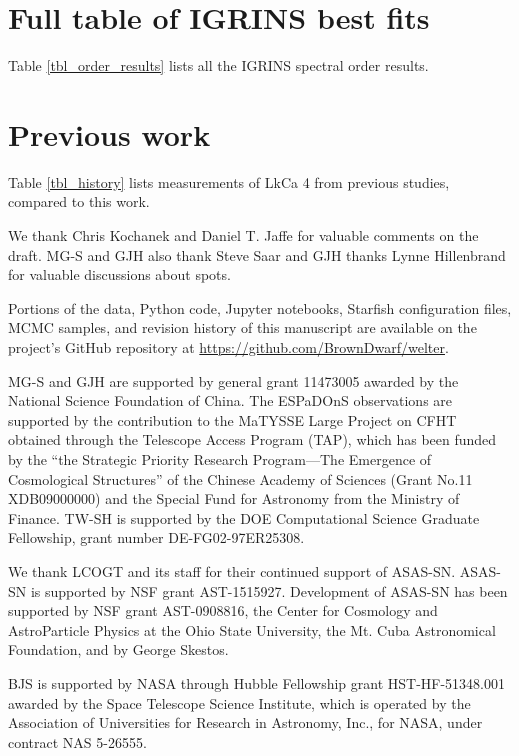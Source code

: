 \documentclass[twocolumn]{emulateapj}%
\newcommand{\name}{LkCa 4 }
\begin{document}
\section{Full table of IGRINS best fits}

Table \ref{tbl_order_results} lists all the IGRINS spectral order results.
\LongTables


\section{Previous work}

Table \ref{tbl_history} lists measurements of \name from previous studies, compared to this work.



\acknowledgements

We thank Chris Kochanek and Daniel T. Jaffe for valuable comments on the draft.  MG-S and GJH also thank Steve Saar and GJH thanks Lynne Hillenbrand for valuable discussions about spots.

Portions of the data, Python code, Jupyter notebooks, Starfish configuration files, MCMC samples, and revision history of this manuscript are available on the project's GitHub repository at \url{https://github.com/BrownDwarf/welter}.

MG-S and GJH are supported by general grant 11473005 awarded by the National Science Foundation of China.   The ESPaDOnS observations are supported by the contribution to the MaTYSSE Large Project on CFHT obtained through the Telescope Access Program (TAP), which has been funded by the ``the Strategic Priority Research Program---The Emergence of Cosmological Structures'' of the Chinese Academy of Sciences (Grant No.11 XDB09000000) and the Special Fund for Astronomy from the Ministry of Finance. 
TW-SH is supported by the DOE Computational Science Graduate Fellowship, grant number DE-FG02-97ER25308.

We thank LCOGT and its staff for their continued support of ASAS-SN. ASAS-SN is supported by NSF grant AST-1515927. Development of ASAS-SN has been supported by NSF grant AST-0908816, the Center for Cosmology and AstroParticle Physics at the Ohio State University, the Mt. Cuba Astronomical Foundation, and by George Skestos. 

BJS is supported by NASA through Hubble Fellowship grant HST-HF-51348.001 awarded by the Space Telescope Science Institute, which is operated by the Association of Universities for Research in Astronomy, Inc., for NASA, under contract NAS 5-26555.  
\end{document}
